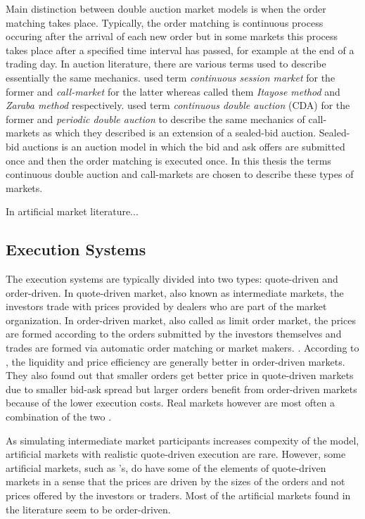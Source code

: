 Main distinction between double auction market models is when
the order matching takes place. Typically, the order matching 
is continuous process occuring after the arrival of each new order but
in some markets this process takes place after a specified time interval
has passed, for example at the end of a trading day. \citep{boer05}
In auction literature, there are various terms used to describe essentially 
the same mechanics. \citet{boer05} used term 
\textit{continuous session market} for the former and \textit{call-market}
for the latter whereas \citet{ASt05} called them \textit{Itayose method}
and \textit{Zaraba method} respectively. \citet{Moc15} used term \textit{continuous 
double auction} (CDA) for the former and \textit{periodic double auction} to describe 
the same mechanics of call-markets as which they described is an extension of 
a sealed-bid auction. Sealed-bid auctions is an auction model in which the bid and ask offers
are submitted once and then the order matching is executed once. In this thesis
the terms continuous double auction and call-markets are chosen to describe
these types of markets.

In artificial market literature...
 
\subsection{Execution Systems}
The execution systems are typically divided into two types:
quote-driven and order-driven. In quote-driven market, also known
as intermediate markets, the investors trade with prices provided 
by dealers who are part of the market organization. 
In order-driven market, also called as limit order market, 
the prices are formed according to the orders submitted by the 
investors themselves and trades are formed via automatic order matching 
or market makers. \citep{Baru17}. According to \citet{MALINOVA2013104},
the liquidity and price efficiency are generally better in order-driven 
markets. They also found out that smaller orders get better price in 
quote-driven markets due to smaller bid-ask spread 
but larger orders benefit from order-driven markets because of the lower 
execution costs. Real markets however are most often a combination
of the two \citep{boer05}.

As simulating intermediate market participants increases compexity
of the model, artificial markets with realistic quote-driven execution are rare. 
However, some artificial markets, such as \citet{SantaFe99}'s, do have some of 
the elements of quote-driven markets in a sense that the prices are driven by 
the sizes of the orders and not prices offered by the investors or traders. 
Most of the artificial markets found in the literature seem to be order-driven.


